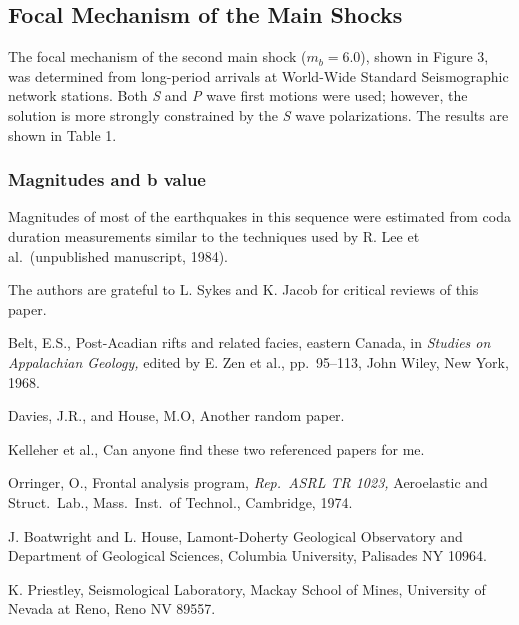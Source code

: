 \subsection{Focal Mechanism of the Main Shocks}
The focal mechanism of the second main shock ($m_b = 6.0$), shown in
Figure 3, was determined from long-period arrivals at World-Wide
Standard Seismographic network stations.  Both {\em S\/} and {\em P\/}
wave first motions were used; however, the solution is more strongly
constrained by the {\em S\/} wave polarizations.  The results are
shown in Table 1.

\subsubsection{Magnitudes and b value}
Magnitudes of most of the earthquakes in this sequence were estimated
from coda duration measurements similar to the techniques used by R.
Lee et al.\ (unpublished manuscript, 1984).

\begin{acknowledgments}
The authors are grateful to L. Sykes and K. Jacob for critical reviews
of this paper.
\end{acknowledgments}

\begin{thebibliography}{}

Belt, E.S., Post-Acadian rifts and related facies, eastern Canada, in 
{\em Studies on Appalachian Geology,} edited by E. Zen et al.,
pp.~95--113, John Wiley, New York, 1968.

Davies, J.R., and House, M.O, Another random paper.

Kelleher et al., Can anyone find these two referenced papers for me.

Orringer, O., Frontal analysis program, {\em Rep.\ ASRL TR 1023,}
Aeroelastic and Struct.\ Lab., Mass.\ Inst.\ of Technol., Cambridge, 1974.
\end{thebibliography}

\begin{addresses}
J. Boatwright and L. House, Lamont-Doherty Geological Observatory and
Department of Geological Sciences, Columbia University, Palisades NY
10964.

K. Priestley, Seismological Laboratory, Mackay School of Mines,
University of Nevada at Reno, Reno NV 89557.
\end{addresses}

